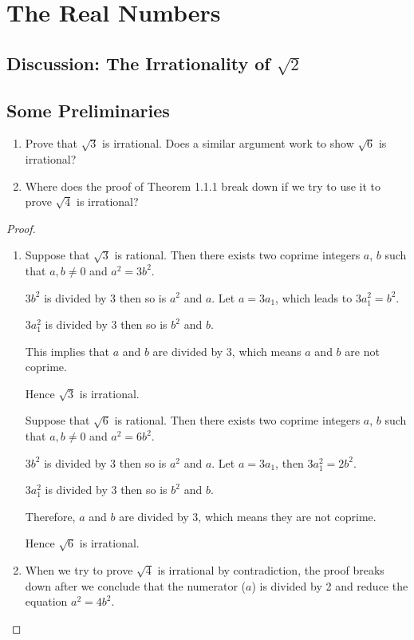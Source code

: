\documentclass[class=understanding-analysis,crop=false]{standalone}
\begin{document}
\chapter{The Real Numbers}

\section{Discussion: The Irrationality of $\sqrt{2}$}

\section{Some Preliminaries}

\begin{exercise}
    \begin{enumerate}[label = (\alph*)]
        \item Prove that $\sqrt{3}$ is irrational. Does a similar argument work to show $\sqrt{6}$ is irrational?
        \item Where does the proof of Theorem 1.1.1 break down if we try to use it to prove $\sqrt{4}$ is irrational?
    \end{enumerate}
\end{exercise}

\begin{proof}
    \begin{enumerate}
        \item Suppose that $\sqrt{3}$ is rational. Then there exists two coprime integers $a$, $b$ such that $a, b\ne 0$ and $a^{2} = 3b^{2}$.
            \par $3b^{2}$ is divided by 3 then so is $a^{2}$ and $a$. Let $a = 3a_{1}$, which leads to $3a_{1}^{2} = b^{2}$.
            \par $3a_{1}^{2}$ is divided by 3 then so is $b^{2}$ and $b$.
            \par This implies that $a$ and $b$ are divided by 3, which means $a$ and $b$ are not coprime.
            \par Hence $\sqrt{3}$ is irrational.
            \bigskip
            \par Suppose that $\sqrt{6}$ is rational. Then there exists two coprime integers $a$, $b$ such that $a, b \ne 0$ and $a^{2} = 6b^{2}$.
            \par $3b^{2}$ is divided by 3 then so is $a^{2}$ and $a$. Let $a = 3a_{1}$, then $3a_{1}^{2} = 2b^{2}$.
            \par $3a_{1}^{2}$ is divided by 3 then so is $b^{2}$ and $b$.
            \par Therefore, $a$ and $b$ are divided by 3, which means they are not coprime.
            \par Hence $\sqrt{6}$ is irrational.
        \item When we try to prove $\sqrt{4}$ is irrational by contradiction, the proof breaks down after we conclude that the numerator ($a$) is divided by 2 and reduce the equation $a^{2} = 4b^{2}$.
    \end{enumerate}
\end{proof}
\end{document}
